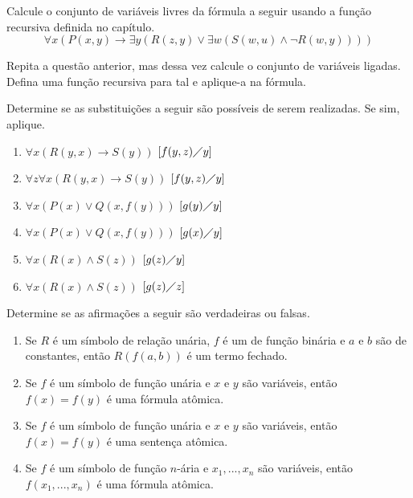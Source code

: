 \begin{exercises}
    \begin{question}
        Calcule o conjunto de variáveis livres da fórmula a seguir usando a função recursiva definida no capítulo.
        \[\forall x(P(x, y) \rightarrow \exists y(R(z,  y) \lor \exists w(S(w, u) \land \neg R(w, y))))\]
    \end{question}
    \begin{question}
        Repita a questão anterior, mas dessa vez calcule o conjunto de variáveis ligadas. Defina uma função recursiva para tal e aplique-a na fórmula.
    \end{question}
    \begin{question}
        Determine se as substituições a seguir são possíveis de serem realizadas. Se sim, aplique.
        \begin{enumerate}
            \item $\forall x(R(y, x) \rightarrow S(y))$ $[f(y, z) \diagup y]$
            \item $\forall z\forall x(R(y, x) \rightarrow S(y))$ $[f(y, z) \diagup y]$
            \item $\forall x(P(x) \lor Q(x, f(y)))$ $[g(y) \diagup y]$
            \item $\forall x(P(x) \lor Q(x, f(y)))$ $[g(x) \diagup y]$
            \item $\forall x(R(x) \land S(z))$ $[g(z) \diagup y]$
            \item $\forall x(R(x) \land S(z))$ $[g(z)\diagup z]$
        \end{enumerate}
    \end{question}
    \begin{question}
        Determine se as afirmações a seguir são verdadeiras ou falsas.
        \begin{enumerate}
            \item Se $R$ é um símbolo de relação unária, $f$ é um de função binária e $a$ e $b$ são de constantes, então $R(f(a,b))$ é um termo fechado.
            \item Se $f$ é um símbolo de função unária e $x$ e $y$ são variáveis, então $f(x) = f(y)$ é uma fórmula atômica.
            \item Se $f$ é um símbolo de função unária e $x$ e $y$ são variáveis, então $f(x) = f(y)$ é uma sentença atômica.
            \item Se $f$ é um símbolo de função $n$-ária e $x_1,...,x_n$ são variáveis, então $f(x_1,...,x_n)$ é uma fórmula atômica.
        \end{enumerate}
    \end{question}
\end{exercises}